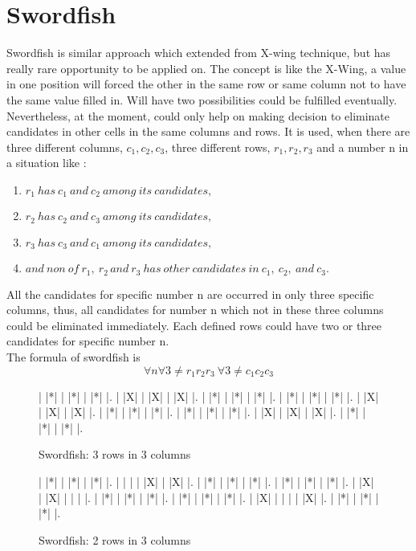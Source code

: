 \documentclass[11pt]{report}
\begin{document}
\section{Swordfish}
\label{sec:Swordfish}
Swordfish is similar approach which extended from X-wing technique, but has really rare opportunity to be applied on. The concept is like the X-Wing, a value in one position will forced the other in the same row or same column not to have the same value filled in. Will have two possibilities could be fulfilled eventually. Nevertheless, at the moment, could only help on making decision to eliminate candidates in other cells in the same columns and rows. It is used, when there are three different columns, $c_{1}, c_{2}, c_{3}$, three different rows, $r_{1}, r_{2}, r_{3}$ and a number n in a situation like :
\begin{enumerate}
\item $r_{1}\ has\ c_{1}\ and\ c_{2}\ among\ its\ candidates,$
\item $r_{2}\ has\ c_{2}\ and\ c_{3}\ among\ its\ candidates,$
\item $r_{3}\ has\ c_{3}\ and\ c_{1}\ among\ its\ candidates,$
\item $and\ non\ of\ r_{1},\ r_{2}\, and\ r_{3}\ has\ other\ candidates\ in\ c_{1},\ c_{2},\ and\ c_{3}.$
\end{enumerate}
All the candidates for specific number n are occurred in only three specific columns, thus, all candidates for number n which not in these three columns could be eliminated immediately. Each defined rows could have two or three candidates for specific number n.\\
The formula of swordfish is
\[ \forall n \forall 3 \neq r_{1} r_{2} r_{3}\ \forall 3 \neq c_{1} c_{2} c_{3}\]
\begin{figure}
\begin{sudoku}
| |*| | |*| | |*| |.
| |X| | |X| | |X| |.
| |*| | |*| | |*| |.
| |*| | |*| | |*| |.
| |X| | |X| | |X| |.
| |*| | |*| | |*| |.
| |*| | |*| | |*| |.
| |X| | |X| | |X| |.
| |*| | |*| | |*| |.
\end{sudoku}
\label{swordfish}
\caption{Swordfish: 3 rows in 3 columns}
\end{figure}

\begin{figure}
\begin{sudoku}
| |*| | |*| | |*| |.
| | | | |X| | |X| |.
| |*| | |*| | |*| |.
| |*| | |*| | |*| |.
| |X| | |X| | | | |.
| |*| | |*| | |*| |.
| |*| | |*| | |*| |.
| |X| | | | | |X| |.
| |*| | |*| | |*| |.
\end{sudoku}
\label{swordfish}
\caption{Swordfish: 2 rows in 3 columns}
\end{figure}
\end{document}
